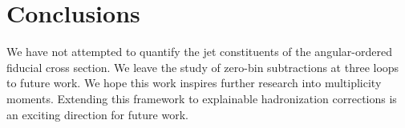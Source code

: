 \section{Conclusions}\label{sec:conclusions}

We have not attempted to quantify the jet constituents of the
angular-ordered fiducial cross section. We leave the study of zero-bin
subtractions at three loops to future work. We hope this work inspires
further research into multiplicity moments. Extending this framework to
explainable hadronization corrections is an exciting direction for
future work.

